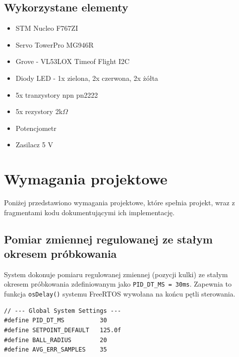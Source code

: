 \documentclass[11pt]{article}
\begin{document}
\subsection{Wykorzystane elementy}

\begin{itemize}
    \item STM Nucleo F767ZI
    \item Servo TowerPro MG946R
    \item Grove - VL53LOX Timeof Flight I2C
    \item Diody LED - 1x zielona, 2x czerwona, 2x żółta 
    \item 5x tranzystory npn pn2222
    \item 5x rezystory 2k$\Omega$
    \item Potencjometr 
    \item Zasilacz 5 V
\end{itemize}


\section{Wymagania projektowe}

Poniżej przedstawiono wymagania projektowe, które spełnia projekt, wraz z fragmentami kodu dokumentującymi ich implementację.

\subsection{Pomiar zmiennej regulowanej ze stałym okresem próbkowania}

System dokonuje pomiaru regulowanej zmiennej (pozycji kulki) ze stałym okresem próbkowania zdefiniowanym jako \texttt{PID\_DT\_MS = 30ms}. Zapewnia to funkcja \texttt{osDelay()} systemu FreeRTOS wywołana na końcu pętli sterowania.

\begin{lstlisting}[caption={Stały okres próbkowania (main.h)}, style=cstyle]
// --- Global System Settings ---
#define PID_DT_MS          30
#define SETPOINT_DEFAULT   125.0f
#define BALL_RADIUS        20
#define AVG_ERR_SAMPLES    35
\end{lstlisting}
\end{document}
